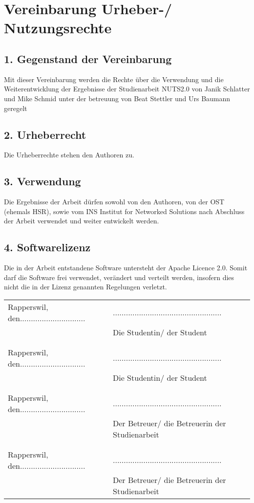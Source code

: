 \documentclass[]{subfiles}
\begin{document}
\section{Vereinbarung Urheber-/ Nutzungsrechte}
\subsection*{1. Gegenstand der Vereinbarung}
    Mit dieser Vereinbarung werden die Rechte über die Verwendung und die 
    Weiterentwicklung der Ergebnisse der Studienarbeit NUTS2.0 von 
    Janik Schlatter und Mike Schmid unter der betreuung von Beat Stettler und 
    Urs Baumann geregelt

\subsection*{2. Urheberrecht}
    Die Urheberrechte stehen den Authoren zu.

\subsection*{3. Verwendung}
    Die Ergebnisse der Arbeit dürfen sowohl von den Authoren, von der OST (ehemals HSR), 
    sowie vom INS Institut for Networked Solutions nach Abschluss der Arbeit verwendet
    und weiter entwickelt werden.

\subsection*{4. Softwarelizenz}
    Die in der Arbeit entstandene Software untersteht der Apache Licence 2.0.
    Somit darf die Software frei verwendet, verändert und verteilt werden, insofern 
    dies nicht die in der Lizenz genannten Regelungen verletzt.

\begin{tabularx}{\textwidth}{XX}
    Rapperswil, den.............................. & .................................................. \\
    & Die Studentin/ der Student \\
    & \\
    & \\
    Rapperswil, den.............................. & .................................................. \\
    & Die Studentin/ der Student \\
    & \\
    & \\
    Rapperswil, den.............................. & .................................................. \\
    & Der Betreuer/ die Betreuerin der Studienarbeit \\
    & \\
    & \\
    Rapperswil, den.............................. & .................................................. \\
    & Der Betreuer/ die Betreuerin der Studienarbeit \\
\end{tabularx}
\end{document}
